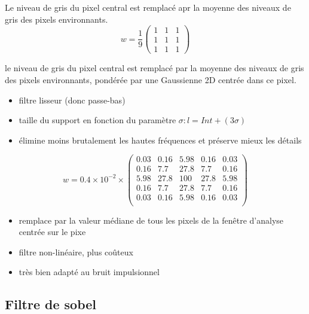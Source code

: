 \documentclass[main.tex]{subfiles}
\begin{document}
\begin{prop}
  Le niveau de gris du pixel central est remplacé apr la moyenne des niveaux de gris des pixels environnants.
  \[
    w = \frac{1}{9}
    \begin{pmatrix}
      1 &1 &1\\
      1 &1 &1\\
      1 &1 &1
    \end{pmatrix}
  \]
\end{prop}
\begin{prop}
le niveau de gris du pixel central est remplacé par la moyenne des niveaux de
gris des pixels environnants, pondérée par une Gaussienne 2D centrée dans ce pixel.
  \begin{itemize}
  \item filtre lisseur (donc passe-bas)
  \item  taille du support en fonction du paramètre $\sigma : l = Int + (3\sigma)$
  \item  élimine moins brutalement les hautes fréquences et préserve mieux les détails
  \end{itemize}

\end{prop}
\begin{exemple}[pour $\sigma = 0.625, l = 2$]
 \[
w = 0.4\times10^{-2}\times
\begin{pmatrix}
0.03& 0.16& 5.98& 0.16&0.03\\
0.16& 7.7 &27.8 &7.7&0.16\\
5.98& 27.8& 100 &27.8&5.98\\
0.16& 7.7 &27.8 &7.7&0.16\\
0.03& 0.16& 5.98 &0.16&0.03\\
\end{pmatrix}
\]
\end{exemple}

\begin{prop}
  \begin{itemize}
  \item remplace par la valeur médiane de tous les pixels de la fenêtre d’analyse centrée sur le pixe
  \item filtre non-linéaire, plus coûteux
  \item très bien adapté au bruit impulsionnel
\end{itemize}
\end{prop}

\subsection{Filtre de sobel}
\end{document}
